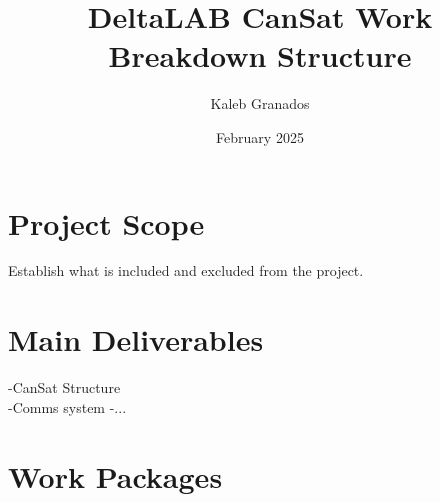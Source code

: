 \documentclass{article}
\title{DeltaLAB CanSat Work Breakdown Structure}
\author{Kaleb Granados}
\date{February 2025}
\begin{document}
\maketitle
\newpage

\section{Project Scope}

Establish what is included and excluded from the project.


\section{Main Deliverables}

-CanSat Structure\\
-Comms system
-...


\section{Work Packages}
\end{document}

